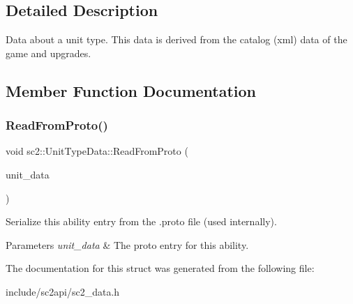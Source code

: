 \subsection{Detailed Description}
Data about a unit type. This data is derived from the catalog (xml) data of the game and upgrades. 

\subsection{Member Function Documentation}
\mbox{\label{structsc2_1_1_unit_type_data_a4d05b07420d5c202b9f397968428254d}} 
\subsubsection{\texorpdfstring{Read\+From\+Proto()}{ReadFromProto()}}
{\footnotesize\ttfamily void sc2\+::\+Unit\+Type\+Data\+::\+Read\+From\+Proto (\begin{DoxyParamCaption}\item[{const S\+C2\+A\+P\+I\+Protocol\+::\+Unit\+Type\+Data \&}]{unit\+\_\+data }\end{DoxyParamCaption})}

Serialize this ability entry from the .proto file (used internally). 
\begin{DoxyParams}{Parameters}
{\em unit\+\_\+data} & The proto entry for this ability. \\
\hline
\end{DoxyParams}


The documentation for this struct was generated from the following file\+:\begin{DoxyCompactItemize}
\item 
include/sc2api/sc2\+\_\+data.\+h\end{DoxyCompactItemize}

